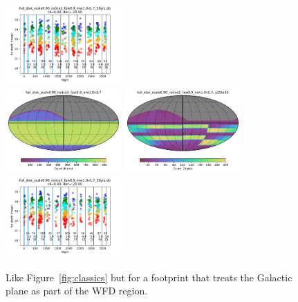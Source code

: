 \documentclass[modern]{aastex62}
\begin{document}
\begin{figure}
\includegraphics[height=1.25in, width=1.75in]{plots/full_disk_scale090_nslice2_fpw09_nrw10v17_spotc.pdf} \\
\includegraphics[height=1.25in, width=1.75in]{plots/full_disk_scale0.90_nslice3_fpw0.9_nrw1.0v1.7/full_disk_scale0_90_nslice3_fpw0_9_nrw1_0v1_7_Count_HEAL_SkyMap.pdf}
\includegraphics[height=1.25in, width=1.75in]{plots/full_disk_scale0.90_nslice3_fpw0.9_nrw1.0v1.7/full_disk_scale0_90_nslice3_fpw0_9_nrw1_0v1_7_Count_night_gt_913_125000_and_night_lt_1278_375000_and_note_not_like_DD_HEAL_SkyMap.pdf}
\includegraphics[height=1.25in, width=1.75in]{plots/full_disk_scale090_nslice3_fpw09_nrw10v17_spotc.pdf}
\caption{Like Figure~\ref{fig:classics} but for a footprint that treats the Galactic plane as part of the WFD region. }
\end{figure}
\end{document}
